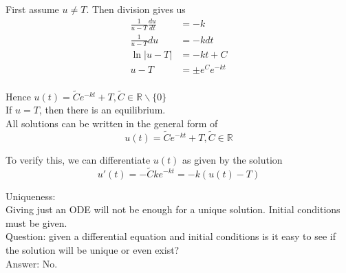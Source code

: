 \documentclass[12pt]{article}
\begin{document}
First assume $u \neq T$. Then division gives us
\begin{align*}
 \frac{1}{u - T} \frac{du}{dt} &= -k \\
 \frac{1}{u - T} du &= -kdt \\
 \ln |u - T| &= -kt + C \\
 u - T &= \pm e^Ce^{-kt} \\
\end{align*}

Hence $u(t) = \tilde{C}e^{-kt} + T, \tilde{C} \in \mathbb{R} \backslash \{0\}$ \\

If $u = T$, then there is an equilibrium. \\
All solutions can be written in the general form of
$$u(t) = \tilde{C}e^{-kt} + T, \tilde{C} \in \mathbb{R}$$

To verify this, we can differentiate $u(t)$ as given by the solution
 $$u'(t) = -\tilde{C}ke^{-kt} = -k(u(t) - T)$$
 
Uniqueness: \\

Giving just an ODE will not be enough for a unique solution. Initial conditions must be given. \\

Question: given a differential equation and initial conditions is it easy to see if the solution will be unique or even exist? \\
Answer: No. \\
\end{document}
